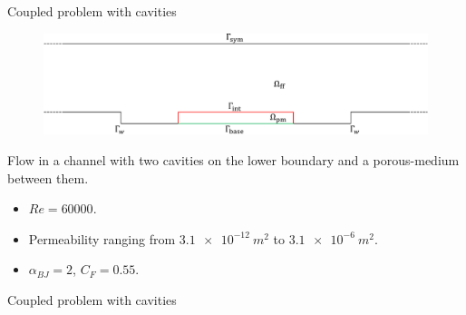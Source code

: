 \documentclass{beamer}
\begin{document}
\begin{frame}{Coupled problem with cavities}
\begin{figure}
	\centering
	\includegraphics[width=\textwidth]{cavities_multidomain.pdf}
\end{figure}
Flow in a channel with two cavities on the lower boundary and a porous-medium 
between them.
\begin{itemize}
	\item $Re=60000$.
	\item Permeability ranging from $\SI{3.1e-12}{m^2}$ to $\SI{3.1e-6}{m^2}$.
	\item $\alpha_{BJ} = 2$, $C_F=0.55$.
\end{itemize}
\end{frame}
\begin{frame}{Coupled problem with cavities}
\begin{figure}
	\centering
	\hspace{-0.5cm}
	
\end{figure}
\end{frame}
\end{document}
